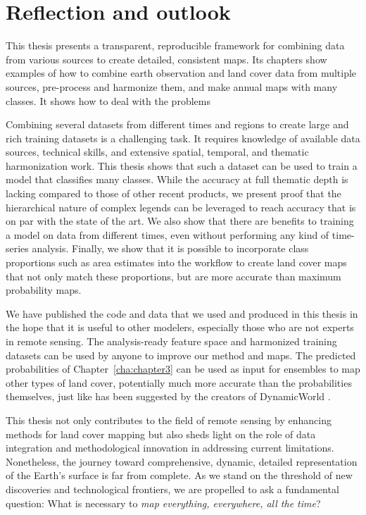 \section{Reflection and outlook}

    This thesis presents a transparent, reproducible framework for combining data from various sources to create detailed, consistent maps. Its chapters show examples of how to combine earth observation and land cover data from multiple sources, pre-process and harmonize them, and make annual maps with many classes. It shows how to deal with the problems
    
    Combining several datasets from different times and regions to create large and rich training datasets is a challenging task. It requires knowledge of available data sources, technical skills, and extensive spatial, temporal, and thematic harmonization work. This thesis shows that such a dataset can be used to train a model that classifies many classes. While the accuracy at full thematic depth is lacking compared to those of other recent products, we present proof that the hierarchical nature of complex legends can be leveraged to reach accuracy that is on par with the state of the art. We also show that there are  benefits to training a model on data from different times, even without performing any kind of time-series analysis. Finally, we show that it is possible to incorporate class proportions such as area estimates into the workflow to create land cover maps that not only match these proportions, but are more accurate than maximum probability maps.

    We have published the code and data that we used and produced in this thesis in the hope that it is useful to other modelers, especially those who are not experts in remote sensing. The analysis-ready feature space and harmonized training datasets can be used by anyone to improve our method and maps. The predicted probabilities of Chapter\@~\ref{cha:chapter3} can be used as input for ensembles to map other types of land cover, potentially much more accurate than the probabilities themselves, just like has been suggested by the creators of DynamicWorld \citep{brown2022dynamic}.

    This thesis not only contributes to the field of remote sensing by enhancing methods for land cover mapping but also sheds light on the role of data integration and methodological innovation in addressing current limitations. Nonetheless, the journey toward comprehensive, dynamic, detailed representation of the Earth's surface is far from complete. As we stand on the threshold of new discoveries and technological frontiers, we are propelled to ask a fundamental question: What is necessary to \textit{map everything, everywhere, all the time}?

